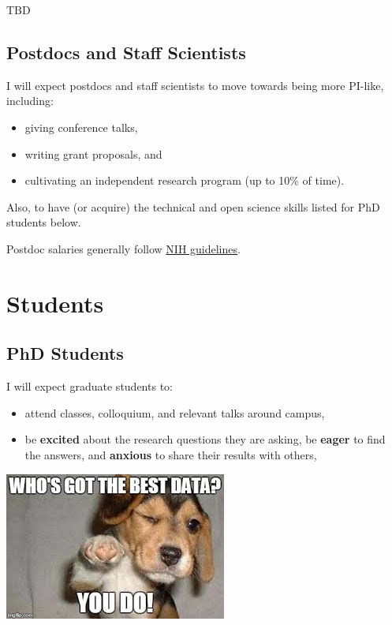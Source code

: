 \documentclass[]{book}
\providecommand{\tightlist}{%
  \setlength{\itemsep}{0pt}\setlength{\parskip}{0pt}}
\begin{document}
TBD

\hypertarget{postdocs-and-staff-scientists}{%
\subsection{Postdocs and Staff Scientists}\label{postdocs-and-staff-scientists}}

I will expect postdocs and staff scientists to move towards being more PI-like, including:

\begin{itemize}
\tightlist
\item
  giving conference talks,\\
\item
  writing grant proposals, and\\
\item
  cultivating an independent research program (up to 10\% of time).
\end{itemize}

Also, to have (or acquire) the technical and open science skills listed for PhD students below.

Postdoc salaries generally follow \href{https://www.niaid.nih.gov/grants-contracts/salary-cap-and-stipend-levels-announced}{NIH guidelines}.

\hypertarget{students}{%
\section{Students}\label{students}}

\hypertarget{phd-students}{%
\subsection{PhD Students}\label{phd-students}}

I will expect graduate students to:

\begin{itemize}
\tightlist
\item
  attend classes, colloquium, and relevant talks around campus,\\
\item
  be \textbf{excited} about the research questions they are asking, be \textbf{eager} to find the answers, and \textbf{anxious} to share their results with others,
\end{itemize}

\includegraphics{images/bestdata.jpeg}
\end{document}
